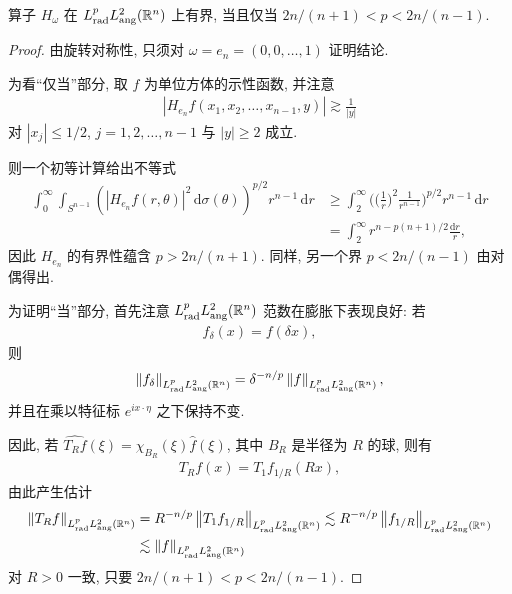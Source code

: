 \begin{theorem}\label{thm:6.7}
算子 $H_\omega$ 在 $L_{\mathrm{rad}}^{p}L_{\mathrm{ang}}^{2}(\mathbb{R}^{n})$ 上有界, 当且仅当 $2n/(n+1) < p < 2n/(n-1)$.
\end{theorem}

\begin{proof}
由旋转对称性, 只须对 $\omega = e_n = (0, 0, \ldots, 1)$ 证明结论.

为看``仅当''部分, 取 $f$ 为单位方体的示性函数, 并注意
\begin{align*}
  |H_{e_{n}}f(x_{1},x_{2},\ldots,x_{n-1},y)|\gtrsim\frac{1}{|y|}
\end{align*}
对 $|x_j| \leq 1/2$, $j = 1, 2, \ldots, n - 1$ 与 $|y| \geq 2$ 成立.

则一个初等计算给出不等式
\begin{align*}
  \int_{0}^{\infty}\int_{S^{n-1}}\left(|H_{e_{n}}f(r,\theta)|^{2}\,\mathrm{d}\sigma(\theta)\right)^{p/2}r^{n-1}\,\mathrm{d}r
  &\geq\int_{2}^{\infty}\Big(\Big(\frac{1}{r}\Big)^{2}\frac{1}{r^{n-1}}\Big)^{p/2}r^{n-1}\,\mathrm{d}r\\
  &=\int_{2}^{\infty}r^{n-p(n+1)/2}\frac{\mathrm{d}r}{r},
\end{align*}
因此 $H_{e_n}$ 的有界性蕴含 $p > 2n/(n+1)$. 同样, 另一个界 $p < 2n/(n-1)$ 由对偶得出.

为证明``当''部分, 首先注意 $L_{\mathrm{rad}}^{p}L_{\mathrm{ang}}^{2}(\mathbb{R}^{n})$ 范数在膨胀下表现良好: 若
\begin{align*}
  f_{\delta}(x)=f(\delta x),
\end{align*}
则
\begin{align*}
  \left\|f_{\delta}\right\|_{L_{\mathrm{rad}}^{p}L_{\mathrm{ang}}^{2}(\mathbb{R}^{n})}
  =\delta^{-n/p}\left\|f\right\|_{L_{\mathrm{rad}}^{p}L_{\mathrm{ang}}^{2}(\mathbb{R}^{n})},
\end{align*}
并且在乘以特征标 $e^{ix\cdot\eta}$ 之下保持不变.

因此, 若 $\widehat{T_R f}(\xi) = \chi_{B_R}(\xi)\widehat{f}(\xi)$, 其中 $B_R$ 是半径为 $R$ 的球, 则有
\begin{align*}
  T_{R}f(x)=T_{1}f_{1/R}(R x),
\end{align*}
由此产生估计
\begin{align*}
  \left\|T_{R}f\right\|_{L_{\mathrm{rad}}^{p}L_{\mathrm{ang}}^{2}(\mathbb{R}^{n})}
  &=R^{-n/p}\left\|T_{1}f_{1/R}\right\|_{L_{\mathrm{rad}}^{p}L_{\mathrm{ang}}^{2}(\mathbb{R}^{n})}
  \lesssim R^{-n/p}\left\|f_{1/R}\right\|_{L_{\mathrm{rad}}^{p}L_{\mathrm{ang}}^{2}(\mathbb{R}^{n})}\\
  &\lesssim\left\|f\right\|_{L_{\mathrm{rad}}^{p}L_{\mathrm{ang}}^{2}(\mathbb{R}^{n})}
\end{align*}
对 $R > 0$ 一致, 只要 $2n/(n+1) < p < 2n/(n-1)$.


\end{proof}
